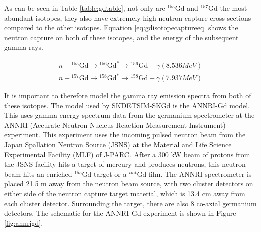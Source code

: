 As can be seen in Table \ref{table:gdtable}, not only are ${ }^{155} \mathrm{Gd}$ and ${ }^{157} \mathrm{Gd}$ the most abundant isotopes, they also have extremely high neutron capture cross sections compared to the other isotopes. Equation \ref{eq:gdisotopecaptureeq} shows the neutron capture on both of these isotopes, and the energy of the subsequent gamma rays.

\begin{equation}
\begin{split}
 {n}+{ }^{155} \mathrm{Gd} \rightarrow{ }^{156} \mathrm{Gd}^{*} \rightarrow{ }^{156} \mathrm{Gd}+\gamma  (8.536 MeV)\\
 {n}+{ }^{157} \mathrm{Gd} \rightarrow{ }^{158} \mathrm{Gd}^{*} \rightarrow{ }^{158} \mathrm{Gd}+\gamma  (7.937 MeV)
\end{split}
\label{eq:gdisotopecaptureeq}    
\end{equation}




It is important to therefore model the gamma ray emission spectra from both of these isotopes. The model used by SKDETSIM-SKGd is the ANNRI-Gd model. This uses gamma energy spectrum data from the germanium spectrometer at the ANNRI (Accurate Neutron Nucleus Reaction Measurement Instrument) experiment. This experiment uses the incoming pulsed neutron beam from the Japan Spallation Neutron Source (JSNS) at the Material and Life Science Experimental Facility (MLF) of J-PARC. After a 300 kW beam of protons from the JSNS facility hits a target of mercury and produces neutrons, this neutron beam hits an enriched ${ }^{155} \mathrm{Gd}$ target or a ${ }^{nat} \mathrm{Gd}$ film. The ANNRI spectrometer is placed 21.5 m away from the neutron beam source, with two cluster detectors on either side of the neutron capture target material, which is 13.4 cm away from each cluster detector. Surrounding the target, there are also 8 co-axial germanium detectors. The schematic for the ANNRI-Gd experiment is shown in Figure \ref{fig:annrigd}.

